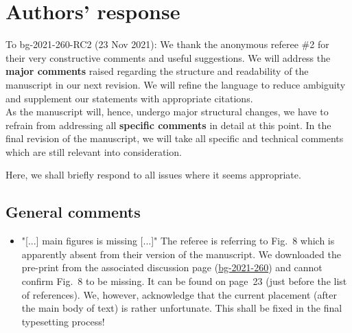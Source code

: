 \documentclass{scrartcl}
\begin{document}
\section*{Authors' response}
To bg-2021-260-RC2 (23 Nov 2021):
We thank the anonymous referee \#2 for their very constructive comments and useful suggestions.
We will address the \textbf{major comments} raised regarding the structure and readability of the manuscript in our next revision. We will refine the language to reduce ambiguity and supplement our statements with appropriate citations.\\
As the manuscript will, hence, undergo major structural changes, we have to refrain from addressing all \textbf{specific comments} in detail at this point. In the final revision of the manuscript, we will take all specific and technical comments which are still relevant into consideration.

Here, we shall briefly respond to all issues where it seems appropriate.
\subsection*{General comments}
\begin{itemize}
    
    \item {\color{blue} "[...] main figures is missing [...]"} The referee is referring to Fig.~8 which is apparently absent from their version of the manuscript. We downloaded the pre-print from the associated discussion page (\href{https://bg.copernicus.org/preprints/bg-2021-260/}{bg-2021-260}) and cannot confirm Fig.~8 to be missing. It can be found on page~23 (just before the list of references). We, however, acknowledge that the current placement (after the main body of text) is rather unfortunate. This shall be fixed in the final typesetting process!

\end{itemize}
\end{document}
